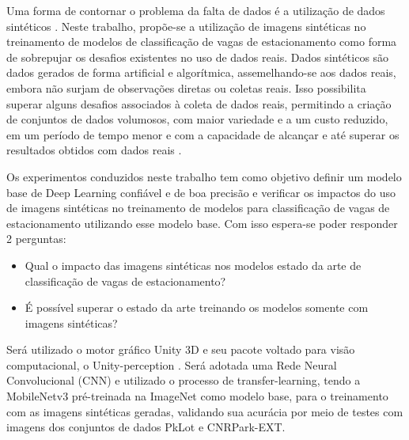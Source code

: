 Uma forma de contornar o problema da falta de dados é a utilização de dados sintéticos \citep{synthetic-pedestrians} \citep{domain-random}. Neste trabalho, propõe-se a utilização de imagens sintéticas no treinamento de modelos de classificação de vagas de estacionamento como forma de sobrepujar os desafios existentes no uso de dados reais. Dados sintéticos são dados gerados de forma artificial e algorítmica, assemelhando-se aos dados reais, embora não surjam de observações diretas ou coletas reais. Isso possibilita superar alguns desafios associados à coleta de dados reais, permitindo a criação de conjuntos de dados volumosos, com maior variedade e a um custo reduzido, em um período de tempo menor e com a capacidade de alcançar e até superar os resultados obtidos com dados reais \citep{objectPose}.

Os experimentos conduzidos neste trabalho tem como objetivo definir um modelo base de Deep Learning confiável e de boa precisão e verificar os impactos do uso de imagens sintéticas no treinamento de modelos para classificação de vagas de estacionamento utilizando esse modelo base. Com isso espera-se poder responder 2 perguntas:
\begin{itemize}
    \item Qual o impacto das imagens sintéticas nos modelos estado da arte de classificação de vagas de estacionamento?
    \item É possível superar o estado da arte treinando os modelos somente com imagens sintéticas?
\end{itemize}

Será utilizado o motor gráfico Unity 3D e seu pacote voltado para visão computacional, o Unity-perception \citep{unity-perception}. Será adotada uma Rede Neural Convolucional (CNN) e utilizado o processo de transfer-learning, tendo a MobileNetv3 \citep{MobileNetV3} pré-treinada na ImageNet como modelo base, para o treinamento com as imagens sintéticas geradas, validando sua acurácia por meio de testes com imagens dos conjuntos de dados PkLot e CNRPark-EXT.


